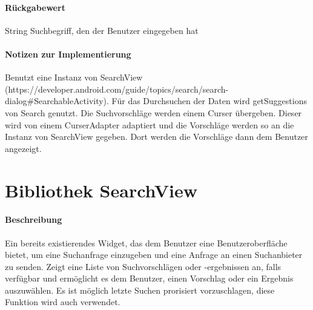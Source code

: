 \paragraph*{Rückgabewert}
String Suchbegriff, den der Benutzer eingegeben hat
\paragraph*{Notizen zur Implementierung}
Benutzt eine Instanz von SearchView (https://developer.android.com/guide/topics/search/search-dialog#SearchableActivity).
Für das Durchsuchen der Daten wird getSuggestions von Search genutzt.
Die Suchvorschläge werden einem Curser übergeben.
Dieser wird von einem CurserAdapter adaptiert und die Vorschläge werden so an die Instanz von SearchView gegeben.
Dort werden die Vorschläge dann dem Benutzer angezeigt.


\section{Bibliothek SearchView}
\paragraph*{Beschreibung}
Ein bereits existierendes Widget, das dem Benutzer eine Benutzeroberfläche bietet, um eine Suchanfrage einzugeben und eine Anfrage an einen Suchanbieter zu senden. 
Zeigt eine Liste von Suchvorschlägen oder -ergebnissen an, falls verfügbar 
und ermöglicht es dem Benutzer, einen Vorschlag oder ein Ergebnis auszuwählen.
Es ist möglich letzte Suchen prorisiert vorzuschlagen, diese Funktion wird auch verwendet.
